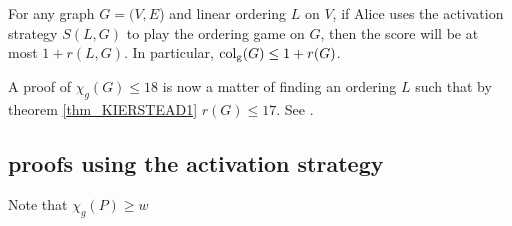 \begin{theorem} \label{thm_KIERSTEAD1}
    For any graph $G=(V, E$) and linear ordering $L$ on $V$, if Alice uses the activation strategy $S(L, G)$ to play the ordering game on $G$, then the score will be at most $1+r(L, G)$. In particular, $\operatorname{col_g}(G) \leq 1+r(G)$.
\end{theorem}

A proof of $\chi_g(G) \leq 18$ is now a matter of finding an ordering $L$ such that by theorem \ref{thm_KIERSTEAD1} $r(G) \leq 17$. See \cite{KIERSTEAD2000}.


\subsection{proofs using the activation strategy}
Note that $\chi_g(P) \geq w$

